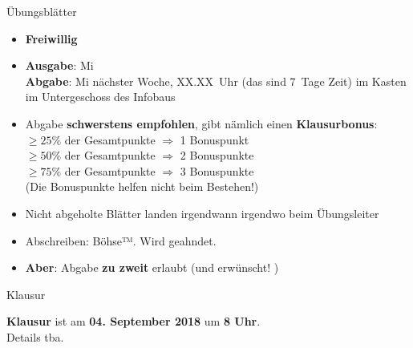 \begin{frame}{Übungsblätter}  %
	\begin{itemize}
		\item \textbf{Freiwillig}
		\item \textbf{Ausgabe}: Mi \\
			  \textbf{Abgabe}: Mi nächster Woche, XX.XX~Uhr (das sind 7~Tage Zeit) im Kasten im Untergeschoss des Infobaus
		\pause
		\item Abgabe \textbf{schwerstens empfohlen}, gibt nämlich einen \textbf{Klausurbonus}: \\
		$\geq 25 \%$ der Gesamtpunkte $ \Rightarrow $ 1 Bonuspunkt \\
		$\geq 50 \%$  der Gesamtpunkte $ \Rightarrow $ 2 Bonuspunkte \\
		$\geq 75 \%$  der Gesamtpunkte $ \Rightarrow $ 3 Bonuspunkte \\
		(Die Bonuspunkte helfen nicht beim Bestehen!)
		\pause
		\item Nicht abgeholte Blätter landen irgendwann irgendwo beim Übungsleiter 
		\pause
		\item Abschreiben: Böhse™. Wird geahndet.
		\pause
		\item \textbf{Aber}: Abgabe \textbf{zu zweit} erlaubt (und erwünscht! \smiley)
	\end{itemize}
\end{frame} 

\begin{frame}{Klausur}
	\begin{center}
		\textbf{Klausur} ist am \textbf{04. September 2018} um \textbf{8 Uhr}. \\
		\smallskip
		Details tba.
	\end{center}
\end{frame}


